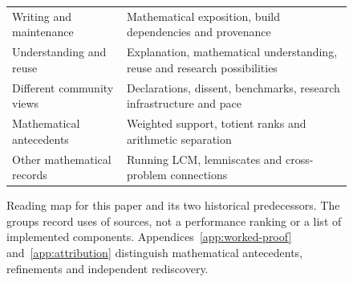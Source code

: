 \documentclass[10pt]{article}
\begin{document}
\begin{figure}[H]
\begin{tabularx}{\linewidth}{@{}>{\raggedright\arraybackslash}p{3.8cm}>{\raggedright\arraybackslash}X@{}}
Writing and maintenance & Mathematical exposition, build dependencies and provenance~\cite{halmos,knuth,buildsystems,dekleer,workflowprovenance}\\
Understanding and reuse & Explanation, mathematical understanding, reuse and research possibilities~\cite{kra,cohn,sanderson,essays,taomining,litt,tao2026}\\
Different community views & Declarations, dissent, benchmarks, research infrastructure and pace~\cite{fieldsdecl,chu,greenletter,gowers,ringer,koukoulopoulos,antieau}\\
Mathematical antecedents & Weighted support, totient ranks and arithmetic separation~\cite{paper257,erdos1968,duverneytachiya,paper249,coons,martin,yazdani}\\
Other mathematical records & Running LCM, lemniscates and cross-problem connections~\cite{paper269,fan269,loxtonvdp1977,bugeaudlaurent2023,erdosgraham,akiyamakaneko,ehp1958,erdos1041,aniforum,fcpr,synthesis}\\
\bottomrule
\end{tabularx}
\caption{Reading map for this paper and its two historical predecessors. The groups record uses of sources, not a performance ranking or a list of implemented components. Appendices~\ref{app:worked-proof} and~\ref{app:attribution} distinguish mathematical antecedents, refinements and independent rediscovery.}
\label{fig:credit}
\end{figure}
\end{document}
